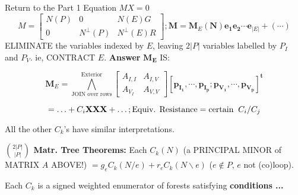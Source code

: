 \documentclass{beamer}
\newcommand{\Remph}[1]{{\color{red}#1}}
\begin{document}
\begin{frame}{Return to the Part 1 Equation $MX=0$}
\[
M = \left[\begin{array}{c|c|c} N(P)  &  0  &  N(E)G \\  \hline
0  & N^{\perp}(P)  &  N^{\perp}(E)R \end{array}\right]
;
\mathbf{M} = \mathbf{M}_E(\mathbf{N})\mathbf{e_1}\mathbf{e_2}\cdots\mathbf{e}_{|E|} + (\cdots) 
\]
ELIMINATE the variables indexed by $E$, leaving $2|P|$ variables
labelled by $P_I$ and $P_V$.  ie, CONTRACT $E$. \textbf{Answer} 
$\mathbf{M_E}$ IS:

\[
\mathbf{M}_E = \bigwedge^{\text{Exterior}}_{\text{JOIN over rows}} \left[\begin{array}{c|c} A_{I,I}  &  A_{I,V}   \\  \hline
    A_{V_I}  & A_{V,V} \end{array}\right] 
[\mathbf{p_{I_1}, \cdots, p_{I_p}; p_{V_1}, \cdots, p_{V_p}}]^{\mathbf{t}} 
\]

\[
 = \ldots + C_i\mbox{\bf XXX} + \ldots; \text{Equiv. Resistance} = 
\text{certain}\;\; C_i/C_j
\]

All the other $C_k$'s have similar interpretations.

{\bf $\binom{2|P|}{|P|}$ Matr. Tree Theorems:}
Each $C_k(N)$ (a PRINCIPAL MINOR of MATRIX \textbf{\Remph{$A$}} ABOVE!)
$= 
g_e C_k(N/e) + r_e C_k(N\backslash e)$ ($e\not\in P$, $e$ not (co)loop).

Each $C_k$ is a signed weighted enumerator of
forests satisfying \textbf{conditions ...}
\end{frame}
\end{document}
